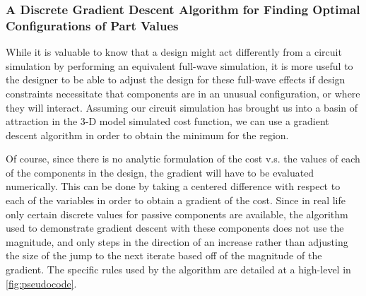 \documentclass[12pt]{usfcoe}
\begin{document}
	\subsubsection{A Discrete Gradient Descent Algorithm for Finding Optimal Configurations of Part Values}
	
    While it is valuable to know that a design might act differently from a circuit simulation by performing an equivalent full-wave simulation, it is more useful to the designer to be able to adjust the design for these full-wave effects if design constraints necessitate that components are in an unusual configuration, or where they will interact.
    Assuming our circuit simulation has brought us into a basin of attraction in the 3-D model simulated cost function, we can use a gradient descent algorithm in order to obtain the minimum for the region.
    
    Of course, since there is no analytic formulation of the cost v.s. the values of each of the components in the design, the gradient will have to be evaluated numerically.
    This can be done by taking a centered difference with respect to each of the variables in order to obtain a gradient of the cost. 
    Since in real life only certain discrete values for passive components are available, the algorithm used to demonstrate gradient descent with these components does not use the magnitude, and only steps in the direction of an increase rather than adjusting the size of the jump to the next iterate based off of the magnitude of the gradient. 
    The specific rules used by the algorithm are detailed at a high-level in \ref{fig:pseudocode}.
    
\end{document}
